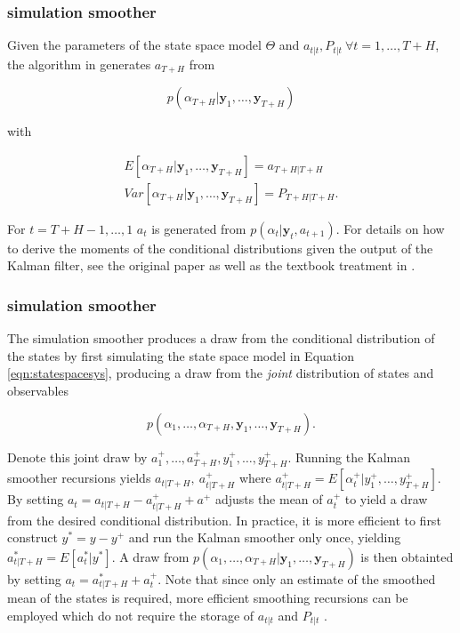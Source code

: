 \documentclass[notitlepage,a4paper,12pt]{article}
\begin{document}
\begin{ThreePartTable}
\subsubsection{\citet{carterkohn1994_biomtr} simulation smoother}

Given the parameters of the state space model $\Theta$ and  $a_{t|t}, P_{t|t} \: \forall t = 1, \dots, T+H$, the algorithm in \citet{carterkohn1994_biomtr} generates $a_{T+H}$ from 

$$
p(\alpha_{T+H}|\mathbf{y}_1, \dots, \mathbf{y}_{T+H})
$$

\noindent with

\begin{align*}
    E[\alpha_{T+H}|\mathbf{y}_1, \dots, \mathbf{y}_{T+H}] = a_{T+H|T+H} \\
    Var[\alpha_{T+H}|\mathbf{y}_1, \dots, \mathbf{y}_{T+H}] = P_{T+H|T+H}.
\end{align*}

 For $t=T+H-1, \dots, 1$ $a_t$ is generated from $p(\alpha_{t}|\mathbf{y}_t, a_{t+1})$. For details on how to derive the moments of the conditional distributions given the output of the Kalman filter, see the original paper as well as the textbook treatment in \citet{KimNelson1999mit}.

 \subsubsection{\citet{durbinkoopman2002_biomtr} simulation smoother}

The \citet{durbinkoopman2002_biomtr} simulation smoother produces a draw from the conditional distribution of the states by first simulating the state space model in Equation \ref{eqn:statespacesys}, producing a draw from the \textit{joint} distribution of states and observables

$$p(\alpha_{1}, \dots, \alpha_{T+H}, \mathbf{y}_1, \dots, \mathbf{y}_{T+H}).$$

Denote this joint draw by $a^+_1, \dots, a^+_{T+H}, y^+_1, \dots, y^+_{T+H}$. Running the Kalman smoother recursions yields $a_{t|T+H}, \: a^+_{t|T+H}$ where $a^+_{t|T+H} = E[\alpha^+_t|y^+_1, \dots, y^+_{T+H}]$.  By setting $a_t = a_{t|T+H} - a^+_{t|T+H} + a^+$ adjusts the mean of $a^+_t$ to yield a draw from the desired conditional distribution. In practice, it is more efficient to first construct $y^* = y-y^+$ and run the Kalman smoother only once, yielding $a^*_{t|T+H} = E[a^*_t|y^*]$. A draw from $p(\alpha_{1}, \dots, \alpha_{T+H}|\mathbf{y}_1, \dots, \mathbf{y}_{T+H})$ is then obtainted by setting $a_t = a^*_{t|T+H} + a^+_t$. Note that since only an estimate of the smoothed mean of the states is required, more efficient smoothing recursions can be employed which do not require the storage of $a_{t|t}$ and $P_{t|t}$ \citep[see][ch. 4.4.2]{durbinkoopman2002_biomtr}.


\end{ThreePartTable}
\end{document}
